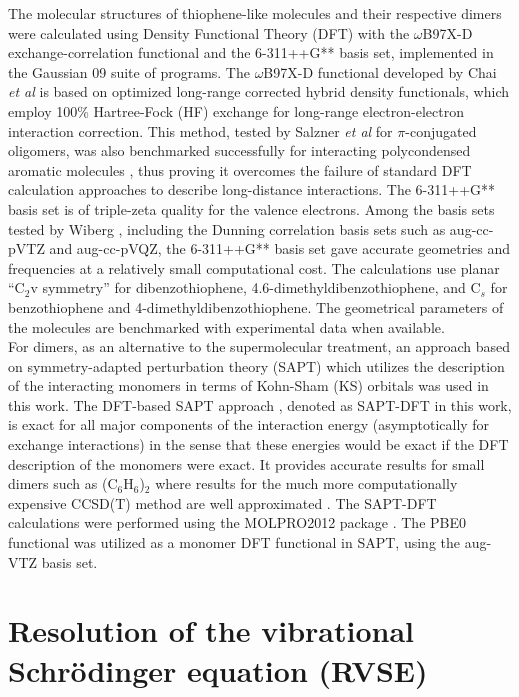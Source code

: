 	The molecular structures of thiophene-like molecules and their respective dimers were calculated using Density Functional Theory (DFT) with the $\omega$B97X-D exchange-correlation functional and the   6-311++G** basis set, implemented in the Gaussian 09 suite of programs. The $\omega$B97X-D functional developed by Chai \textit{et al} \cite{chai2008systematic} is based on optimized long-range corrected hybrid density functionals, which employ 100\% Hartree-Fock (HF) exchange for long-range electron-electron interaction correction. This method, tested by Salzner \textit{et al} \cite{salzner2011improved} for $\pi$-conjugated oligomers, was also benchmarked successfully for interacting polycondensed aromatic molecules \cite{spillebout2014discerning}, thus proving it overcomes the failure of standard DFT calculation approaches to describe long-distance interactions. The 6-311++G** basis set is of triple-zeta quality for the valence electrons. Among the basis sets tested by Wiberg \cite{wiberg2004basis}, including the Dunning correlation basis sets such as aug-cc-pVTZ and aug-cc-pVQZ, the 6-311++G** basis set gave accurate geometries and frequencies at a relatively small computational cost. The calculations use planar “C$_{2}$v symmetry” for dibenzothiophene, 4.6-dimethyldibenzothiophene, and C$_{s}$ for benzothiophene and 4-dimethyldibenzothiophene. The geometrical parameters of the molecules are benchmarked with experimental data when available.\\
	
	For dimers, as an alternative to the supermolecular treatment, an approach based on symmetry-adapted perturbation theory (SAPT) \cite{jeziorski1994perturbation} which utilizes the description of the interacting monomers in terms of Kohn-Sham (KS) orbitals was used in this work. The DFT-based SAPT approach \cite{hesselmann2005density}, denoted as SAPT-DFT in this work, is exact for all major components of the interaction energy (asymptotically for exchange interactions) in the sense that these energies would be exact if the DFT description of the monomers were exact. It provides accurate results for small dimers such as (C$_{6}$H$_{6}$)$_{2}$ where results for the much more computationally expensive CCSD(T) method are well approximated \cite{podeszwa2006potential}. The SAPT-DFT calculations were performed using the MOLPRO2012 package \cite{MOLPRO_brief}. The PBE0 functional \cite{adamo1999toward} was utilized as a monomer DFT functional in SAPT, using the aug-VTZ basis set.
	
	\section{Resolution of the vibrational Schr\"{o}dinger equation  (RVSE)}
	
